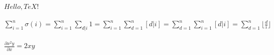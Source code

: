\documentclass{article}
\begin{document}
	$Hello, TeX!$\\ \\
	$\sum\limits_{i=1}^{n}\sigma(i) = \sum\limits_{i=1}^{n}\sum\limits_{d|i}1 = \sum\limits_{i=1}^{n}\sum\limits_{d=1}^{n}{[d|i]} = \sum\limits_{d=1}^{n}\sum\limits_{i=1}^{n}{[d|i]} = \sum\limits_{d=1}^{n}{\lfloor{\frac{d}{i}}\rfloor}$\\ \\
	$\frac{\partial {x^2}y}{\partial x}=2xy$\\ \\
\end{document}
